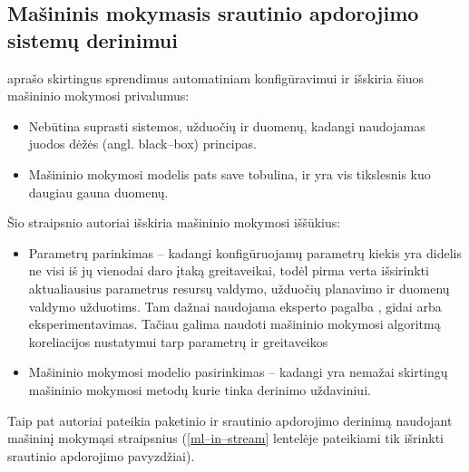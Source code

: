 \documentclass{VUMIFPSbakalaurinis}
\begin{document}
\subsection{Mašininis mokymasis srautinio apdorojimo sistemų derinimui}

\cite{herodotou2020survey} aprašo skirtingus sprendimus automatiniam konfigūravimui ir išskiria šiuos mašininio mokymosi privalumus:
\begin{itemize}
    \item Nebūtina suprasti sistemos, užduočių ir duomenų, kadangi naudojamas juodos dėžės (angl. black–box) principas.
    \item Mašininio mokymosi modelis pats save tobulina, ir yra vis tikslesnis kuo daugiau gauna duomenų. 
\end{itemize}
Šio straipsnio autoriai išskiria mašininio mokymosi iššūkius: 
\begin{itemize}
    \item Parametrų parinkimas – kadangi konfigūruojamų parametrų kiekis yra didelis \cite{Bilal2017Towards, petridis2016spark} ne visi iš jų vienodai daro įtaką greitaveikai, todėl pirma verta išsirinkti aktualiausius parametrus resursų valdymo, užduočių planavimo ir duomenų valdymo užduotims. Tam dažnai naudojama eksperto pagalba \cite{wang2016novel}, gidai arba eksperimentavimas. Tačiau galima naudoti mašininio mokymosi algoritmą koreliacijos nustatymui tarp parametrų ir greitaveikos \cite{vaquero2018autotuning, yang2012statistics}
    \item Mašininio mokymosi modelio pasirinkimas – kadangi yra nemažai skirtingų mašininio mokymosi metodų kurie tinka derinimo uždaviniui.
\end{itemize} 
Taip pat autoriai pateikia paketinio ir srautinio apdorojimo derinimą naudojant mašininį mokymąsi straipsnius (\ref{ml–in–stream} lentelėje pateikiami tik išrinkti srautinio apdorojimo pavyzdžiai).
\end{document}
